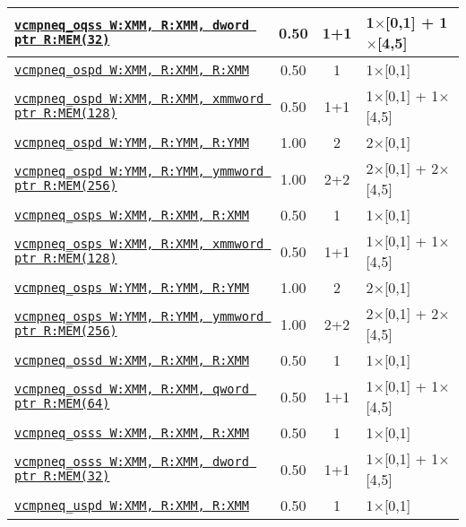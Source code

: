 \documentclass[a4paper,english,fontsize=9]{scrartcl}
\begin{document}
\begin{longtable}{p{}ccL{.25\textwidth}}
  \midrule
  \texttt{\href{https://felixcloutier.com/x86/CMPSS.html}{vcmpneq\_oqss W:XMM, R:XMM, dword ptr R:MEM(32)}} & 0.50 & 1+1 & 1\(\times\)[0,1] + 1\(\times\)[4,5] \\
  \midrule
  \texttt{\href{https://felixcloutier.com/x86/CMPPD.html}{vcmpneq\_ospd W:XMM, R:XMM, R:XMM}} & 0.50 & 1 & 1\(\times\)[0,1] \\
  \midrule
  \texttt{\href{https://felixcloutier.com/x86/CMPPD.html}{vcmpneq\_ospd W:XMM, R:XMM, xmmword ptr R:MEM(128)}} & 0.50 & 1+1 & 1\(\times\)[0,1] + 1\(\times\)[4,5] \\
  \midrule
  \texttt{\href{https://felixcloutier.com/x86/CMPPD.html}{vcmpneq\_ospd W:YMM, R:YMM, R:YMM}} & 1.00 & 2 & 2\(\times\)[0,1] \\
  \midrule
  \texttt{\href{https://felixcloutier.com/x86/CMPPD.html}{vcmpneq\_ospd W:YMM, R:YMM, ymmword ptr R:MEM(256)}} & 1.00 & 2+2 & 2\(\times\)[0,1] + 2\(\times\)[4,5] \\
  \midrule
  \texttt{\href{https://felixcloutier.com/x86/CMPPS.html}{vcmpneq\_osps W:XMM, R:XMM, R:XMM}} & 0.50 & 1 & 1\(\times\)[0,1] \\
  \midrule
  \texttt{\href{https://felixcloutier.com/x86/CMPPS.html}{vcmpneq\_osps W:XMM, R:XMM, xmmword ptr R:MEM(128)}} & 0.50 & 1+1 & 1\(\times\)[0,1] + 1\(\times\)[4,5] \\
  \midrule
  \texttt{\href{https://felixcloutier.com/x86/CMPPS.html}{vcmpneq\_osps W:YMM, R:YMM, R:YMM}} & 1.00 & 2 & 2\(\times\)[0,1] \\
  \midrule
  \texttt{\href{https://felixcloutier.com/x86/CMPPS.html}{vcmpneq\_osps W:YMM, R:YMM, ymmword ptr R:MEM(256)}} & 1.00 & 2+2 & 2\(\times\)[0,1] + 2\(\times\)[4,5] \\
  \midrule
  \texttt{\href{https://felixcloutier.com/x86/CMPSD.html}{vcmpneq\_ossd W:XMM, R:XMM, R:XMM}} & 0.50 & 1 & 1\(\times\)[0,1] \\
  \midrule
  \texttt{\href{https://felixcloutier.com/x86/CMPSD.html}{vcmpneq\_ossd W:XMM, R:XMM, qword ptr R:MEM(64)}} & 0.50 & 1+1 & 1\(\times\)[0,1] + 1\(\times\)[4,5] \\
  \midrule
  \texttt{\href{https://felixcloutier.com/x86/CMPSS.html}{vcmpneq\_osss W:XMM, R:XMM, R:XMM}} & 0.50 & 1 & 1\(\times\)[0,1] \\
  \midrule
  \texttt{\href{https://felixcloutier.com/x86/CMPSS.html}{vcmpneq\_osss W:XMM, R:XMM, dword ptr R:MEM(32)}} & 0.50 & 1+1 & 1\(\times\)[0,1] + 1\(\times\)[4,5] \\
  \midrule
  \texttt{\href{https://felixcloutier.com/x86/CMPPD.html}{vcmpneq\_uspd W:XMM, R:XMM, R:XMM}} & 0.50 & 1 & 1\(\times\)[0,1] \\

\end{longtable}
\end{document}
